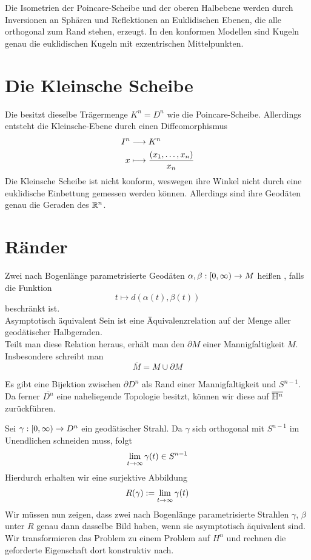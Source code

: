 \documentclass{book}
\begin{document}
\Prop{}
Die Isometrien der Poincare-Scheibe und der oberen Halbebene werden durch Inversionen an Sphären und Reflektionen an Euklidischen Ebenen, die alle orthogonal zum Rand stehen, erzeugt.
\Prop{}
In den konformen Modellen sind Kugeln genau die euklidischen Kugeln mit exzentrischen Mittelpunkten.

\section{Die Kleinsche Scheibe}
\Def{}
Die  besitzt dieselbe Trägermenge $K^n = D^n$ wie die Poincare-Scheibe. Allerdings entsteht die Kleinsche-Ebene durch einen Diffeomorphismus
\begin{align*}
I^n & \overset{}{\longrightarrow} K^n\\
x & \longmapsto \frac{(x_1,\ldots,x_n)}{x_n}
\end{align*}
Die Kleinsche Scheibe ist nicht konform, weswegen ihre Winkel nicht durch eine euklidische Einbettung gemessen werden können. Allerdings sind ihre Geodäten genau die Geraden des $\mathbb{R}^n$.

\section{Ränder}
\Def{}
Zwei nach Bogenlänge parametrisierte Geodäten $\alpha, \beta : [0, \infty) \overset{}{\rightarrow} M$ heißen , falls die Funktion
\[ t \longmapsto d(\alpha(t), \beta(t)) \]
beschränkt ist.\\
Asymptotisch äquivalent Sein ist eine Äquivalenzrelation auf der Menge aller geodätischer Halbgeraden.\\
Teilt man diese Relation heraus, erhält man den  $\partial M$ einer Mannigfaltigkeit $M$. Insbesondere schreibt man
\[ \overline{M} = M \cup \partial M \]

\Prop{}
Es gibt eine Bijektion zwischen $\partial D^n$ als Rand einer Mannigfaltigkeit und $S^{n-1}$.\\
Da ferner $\overline{D^n}$ eine naheliegende Topologie besitzt, können wir diese auf $\overline{\mathbb{H}^n}$ zurückführen.
\begin{Beweis}{}
	Sei $\gamma : [0, \infty) \overset{}{\rightarrow} D^n$ ein geodätischer Strahl. Da $\gamma$ sich orthogonal mit $S^{n-1}$ im Unendlichen schneiden muss, folgt
	\[ \lim\limits_{t \overset{}{\rightarrow} \infty} \gamma(t) \in S^{n-1} \]
	Hierdurch erhalten wir eine surjektive Abbildung
	\[ R(\gamma) :=  \lim\limits_{t \overset{}{\rightarrow} \infty} \gamma(t) \]
	Wir müssen nun zeigen, dass zwei nach Bogenlänge parametrisierte Strahlen $\gamma$, $\beta$ unter $R$ genau dann dasselbe Bild haben, wenn sie asymptotisch äquivalent sind.\\
Wir transformieren das Problem zu einem Problem auf $H^n$ und rechnen die geforderte Eigenschaft dort konstruktiv nach.
\end{Beweis}
\end{document}
